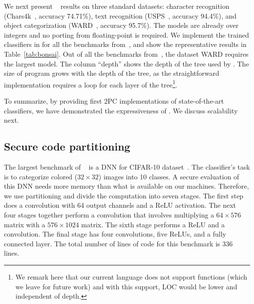 We next present \bonsai~\cite{bonsai} results on three
standard datasets: character recognition (Chars4k~\cite{campos},
accuracy 74.71\%), text recognition (USPS~\cite{hull}, accuracy
94.4\%), and object categorization (WARD~\cite{yang}, accuracy
95.7\%). 
The \bonsai models are already over integers and no porting from
floating-point is required.
We implement the trained classifiers in \tool for all the benchmarks
from~\cite{bonsai},
and show the representative results in Table~\ref{tab:bonsai}.
Out of all the benchmarks from~\cite{bonsai}, the dataset WARD
requires the largest model. 
The column ``depth''  shows the depth of the
tree used by \bonsai. The size of \tool 
program grows with the depth of the tree, as the straightforward \tool
implementation requires a loop for each layer of the
tree\footnote{We remark here that our current language does not support functions (which we leave for future work) and with this support, LOC would be lower and independent of depth.}. 

To summarize, by providing first 2PC implementations of
state-of-the-art classifiers, we have demonstrated the expressiveness
of \tool. We discuss scalability next.


\subsection{Secure code partitioning}
\label{sec:pipeeval}
The largest benchmark of \minion~\cite{minionn} is a DNN for CIFAR-10
dataset~\cite{cifar}. 
The classifier's task is to categorize colored ($32\times 32$) images
into 10 classes. A secure evaluation of this DNN needs more memory
than what is available
on our machines. Therefore, we use partitioning and divide the
computation into seven stages. 
The first step does a convolution with 64 output channels and a ReLU
activation. The next four stages together perform a convolution that
involves multiplying a $64\times 576$ matrix with a 
$576\times 1024$ matrix. The sixth stage performs a ReLU and a
convolution. The final stage has four convolutions, five ReLUs, and a
fully connected layer. The total number of lines of \tool code for
this benchmark is 336 lines.

